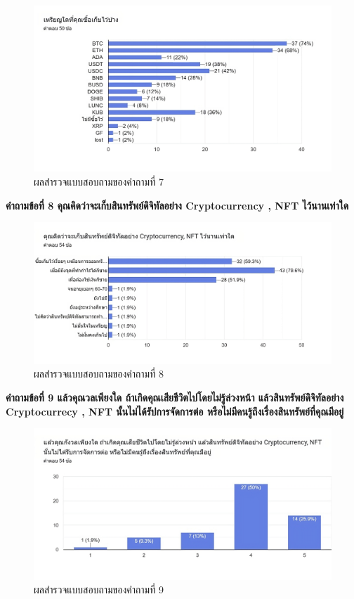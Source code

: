 \documentclass[12pt,oneside,openright,a4paper]{cpe-thai-project}
\begin{document}
\begin{figure}[!thb]
			\centering
			\includegraphics[scale=0.4]{apprex7}
			\caption{ผลสำรวจแบบสอบถามของคำถามที่ 7}
		\end{figure}
\FloatBarrier
\bf คำถามข้อที่ 8 คุณคิดว่าจะเก็บสินทรัพย์ดิจิทัลอย่าง Cryptocurrency , NFT ไว้นานเท่าใด\\
\begin{figure}[!thb]
			\centering
			\includegraphics[scale=0.4]{apprex8}
			\caption{ผลสำรวจแบบสอบถามของคำถามที่ 8}
		\end{figure}
\FloatBarrier
\bf คำถามข้อที่ 9  แล้วคุณวลเพียงใด ถ้าเกิดคุณเสียชีวิตไปโดยไม่รู้ล่วงหน้า แล้วสินทรัพย์ดิจิทัลอย่าง Cryptocurrecy , NFT นั้นไม่ได้รัปการจัดการต่อ หรือไม่มีคนรู้ถึงเรื่องสินทรัพย์ที่คุณมีอยู่\\
\begin{figure}[!thb]
			\centering
			\includegraphics[scale=0.2]{apprex9}
			\caption{ผลสำรวจแบบสอบถามของคำถามที่ 9}
		\end{figure}
\end{document}
